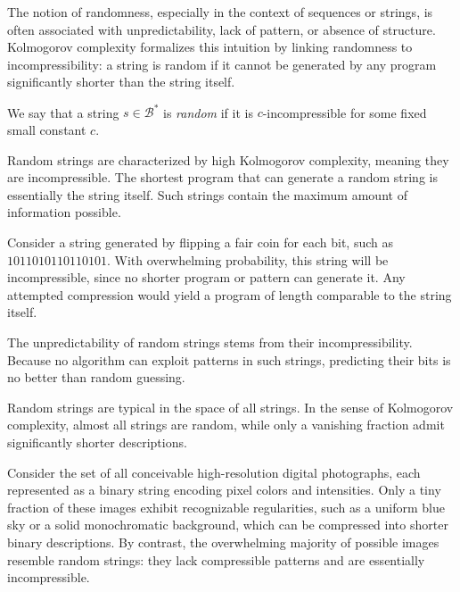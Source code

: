 The notion of randomness, especially in the context of sequences or strings, is often associated with unpredictability, lack of pattern, or absence of structure. Kolmogorov complexity formalizes this intuition by linking randomness to incompressibility: a string is random if it cannot be generated by any program significantly shorter than the string itself.

\begin{definition}
We say that a string $s \in \mathcal{B}^{\ast}$ is \emph{random} if it is $c$-incompressible for some fixed small constant $c$.
\end{definition}

Random strings are characterized by high Kolmogorov complexity, meaning they are incompressible. The shortest program that can generate a random string is essentially the string itself. Such strings contain the maximum amount of information possible.

\begin{example}
Consider a string generated by flipping a fair coin for each bit, such as $1011010110110101$. With overwhelming probability, this string will be incompressible, since no shorter program or pattern can generate it. Any attempted compression would yield a program of length comparable to the string itself.
\end{example}

The unpredictability of random strings stems from their incompressibility. Because no algorithm can exploit patterns in such strings, predicting their bits is no better than random guessing.

Random strings are typical in the space of all strings. In the sense of Kolmogorov complexity, almost all strings are random, while only a vanishing fraction admit significantly shorter descriptions.

\begin{example}
Consider the set of all conceivable high-resolution digital photographs, each represented as a binary string encoding pixel colors and intensities. Only a tiny fraction of these images exhibit recognizable regularities, such as a uniform blue sky or a solid monochromatic background, which can be compressed into shorter binary descriptions. By contrast, the overwhelming majority of possible images resemble random strings: they lack compressible patterns and are essentially incompressible.
\end{example}


%
%

